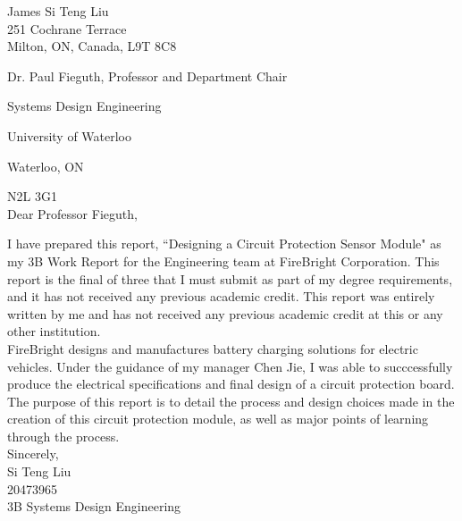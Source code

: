 \documentclass[12pt]{article}
\title{\reportTitle}
\author{\studentName}
\date{\reportDueDate}
\def\reportTitle{Designing a Circuit Protection Sensor Module}
\def\studentName{Si Teng Liu}
\def\studentNumber{20473965}
\def\company{FireBright Corporation}
\begin{document}
    
    \startindent
	\makewtrtitle
	\stopindent
	
	
	\begin{singlespace}
        \begin{flushright}
        James Si Teng Liu\\
    	251 Cochrane Terrace\\
	    Milton, ON, Canada, L9T 8C8\\
	    \end{flushright}


		Dr. Paul Fieguth, Professor and Department Chair
	
		Systems Design Engineering
	
	    University of Waterloo
	
	    Waterloo, ON
	
	    N2L 3G1\\
	
		Dear Professor Fieguth,
	\end{singlespace}
    
        I have prepared this report, ``\reportTitle" as my 3B Work Report for the Engineering team at \company. This report is the final of three that I must submit as part of my degree requirements, and it has not received any previous academic credit. This report was entirely written by me and has not received any previous academic credit at this or any other institution.\\
    	
    	FireBright designs and manufactures battery charging solutions for electric vehicles. Under the guidance of my manager Chen Jie, I was able to succcessfully produce the electrical specifications and final design of a circuit protection board.\\
    	
    	The purpose of this report is to detail the process and design choices made in the creation of this circuit protection module, as well as major points of learning through the process. \\


	    \noindent
	    Sincerely,\\
    	
    	\studentName \\
    	\studentNumber \\
        3B Systems Design Engineering

	\newpage
\end{document}
